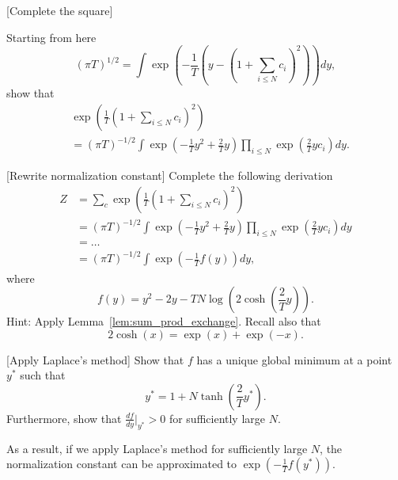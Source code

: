 \begin{exercise}{[Complete the square]}

Starting from here
%
\begin{equation}
\left(\pi T\right)^{1/2} = \int \exp\left(-\frac{1}{T}\left(y - \left(1 + \sum_{i \leq N}c_i\right)^2\right)\right)dy,
\end{equation}
%
show that
%
\begin{align*}
&\exp\left(\frac{1}{T}\left(1 + \sum_{i \leq N}c_i\right)^2\right)\\ 
&= \left(\pi T\right)^{-1/2}\int\exp\left(-\frac{1}{T}y^2 + \frac{2}{T}y\right) \prod_{i \leq N}\exp\left(\frac{2}{T}y c_i\right) dy.
\end{align*}
%
\end{exercise}

\begin{exercise}{[Rewrite normalization constant]}
Complete the following derivation
%
\begin{align}
Z &= \sum_{c} \exp\left(\frac{1}{T}\left(1 + \sum_{i \leq N}c_i\right)^2\right)\\ 
&= \left(\pi T\right)^{-1/2}\int\exp\left(-\frac{1}{T}y^2 + \frac{2}{T}y\right) \prod_{i \leq N}\exp\left(\frac{2}{T}y c_i\right) dy\\
&= \ldots \\
&= \left(\pi T\right)^{-1/2}\int \exp\left(-\frac{1}{T}f(y)\right) dy,\label{eq:norm_cost_ugly_integral}
\end{align}
%
where
%
\begin{equation}
f(y) = y^2 - 2 y - T N \log \left(2 \cosh\left(\frac{2}{T}y\right)\right).
\end{equation}
%
Hint: Apply Lemma~\ref{lem:sum_prod_exchange}. Recall also that
%
\begin{equation}
2 \cosh(x) = \exp(x) + \exp(-x).
\end{equation}
%
\end{exercise}

\begin{exercise}{[Apply Laplace's method]}
Show that $f$ has a unique global minimum at a point $y^*$ such that
%
\begin{equation}
y^* = 1 + N \tanh\left(\frac{2}{T}y^*\right).
\end{equation}
% 
Furthermore, show that $\frac{df}{dy}\bigr|_{y^*} > 0$ for sufficiently large $N$.
\end{exercise}

As a result, if we apply Laplace's method for sufficiently large $N$, the normalization constant can be approximated to $\exp\left(-\frac{1}{T}f(y^*)\right)$.
%
%

